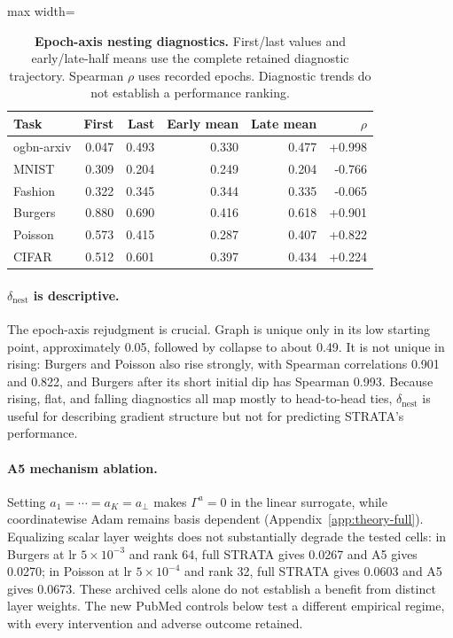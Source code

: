 \begin{table}[htbp]
\centering
\caption{\textbf{Epoch-axis nesting diagnostics.} First/last values and early/late-half means use the complete retained diagnostic trajectory. Spearman $\rho$ uses recorded epochs. Diagnostic trends do not establish a performance ranking.}
\label{tab:dnest}
\begin{adjustbox}{max width=\linewidth}
\begin{tabular}{lrrrrr}
\toprule
Task & First & Last & Early mean & Late mean & $\rho$ \\
\midrule
ogbn-arxiv & 0.047 & 0.493 & 0.330 & 0.477 & +0.998 \\
MNIST & 0.309 & 0.204 & 0.249 & 0.204 & -0.766 \\
Fashion & 0.322 & 0.345 & 0.344 & 0.335 & -0.065 \\
Burgers & 0.880 & 0.690 & 0.416 & 0.618 & +0.901 \\
Poisson & 0.573 & 0.415 & 0.287 & 0.407 & +0.822 \\
CIFAR & 0.512 & 0.601 & 0.397 & 0.434 & +0.224 \\
\bottomrule
\end{tabular}
\end{adjustbox}
\end{table}


\paragraph{$\delta_{\mathrm{nest}}$ is descriptive.} The epoch-axis rejudgment is crucial. Graph is unique only in its low starting point, approximately 0.05, followed by collapse to about 0.49. It is not unique in rising: Burgers and Poisson also rise strongly, with Spearman correlations 0.901 and 0.822, and Burgers after its short initial dip has Spearman 0.993. Because rising, flat, and falling diagnostics all map mostly to head-to-head ties, $\delta_{\mathrm{nest}}$ is useful for describing gradient structure but not for predicting STRATA's performance.

\paragraph{A5 mechanism ablation.} Setting $a_1=\cdots=a_K=a_\perp$ makes $\Gamma^a=0$ in the linear surrogate, while coordinatewise Adam remains basis dependent (Appendix~\ref{app:theory-full}). Equalizing scalar layer weights does not substantially degrade the tested cells: in Burgers at lr $5\times10^{-3}$ and rank 64, full STRATA gives 0.0267 and A5 gives 0.0270; in Poisson at lr $5\times10^{-4}$ and rank 32, full STRATA gives 0.0603 and A5 gives 0.0673. These archived cells alone do not establish a benefit from distinct layer weights. The new PubMed controls below test a different empirical regime, with every intervention and adverse outcome retained.



